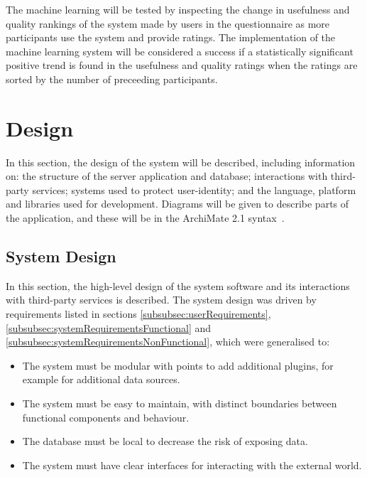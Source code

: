 \documentclass[authoryearcitations]{UoYCSproject}
\begin{document}
The machine learning will be tested by inspecting the change in usefulness and quality rankings of the system made by users in the questionnaire as more participants use the system and provide ratings. The implementation of the machine learning system will be considered a success if a statistically significant positive trend is found in the usefulness and quality ratings when the ratings are sorted by the number of preceeding participants.

\newpage
\chapter{Design}
\label{sec:design}
In this section, the design of the system will be described, including information on: the structure of the server application and database; interactions with third-party services; systems used to protect user-identity; and the language, platform and libraries used for development. Diagrams will be given to describe parts of the application, and these will be in the ArchiMate 2.1 syntax~\cite{archiMateSpec}.

\section{System Design}
\label{sec:sysDesign}
In this section, the high-level design of the system software and its interactions with third-party services is described.  The system design was driven by requirements listed in sections \ref{subsubsec:userRequirements}, \ref{subsubsec:systemRequirementsFunctional} and \ref{subsubsec:systemRequirementsNonFunctional}, which were generalised to:

\begin{itemize}
    \item The system must be modular with points to add additional plugins, for example for additional data sources.
    \item The system must be easy to maintain, with distinct boundaries between functional components and behaviour.
    \item The database must be local to decrease the risk of exposing data.
    \item The system must have clear interfaces for interacting with the external world.
\end{itemize}
\end{document}
